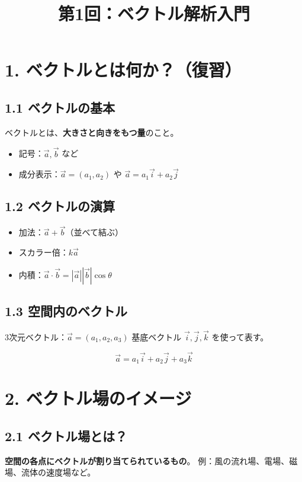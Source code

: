 \documentclass[a4j,11pt]{jsarticle}
\title{第1回：ベクトル解析入門}
\author{}
\date{}
\begin{document}
\maketitle

\section*{1. ベクトルとは何か？（復習）}

\subsection*{1.1 ベクトルの基本}
ベクトルとは、\textbf{大きさと向きをもつ量}のこと。

\begin{itemize}
  \item 記号：$\vec{a}, \vec{b}$ など
  \item 成分表示：$\vec{a} = (a_1, a_2)$ や $\vec{a} = a_1\vec{i} + a_2\vec{j}$
\end{itemize}

\subsection*{1.2 ベクトルの演算}
\begin{itemize}
  \item 加法：$\vec{a} + \vec{b}$（並べて結ぶ）
  \item スカラー倍：$k\vec{a}$
  \item 内積：$\vec{a} \cdot \vec{b} = |\vec{a}||\vec{b}|\cos\theta$
\end{itemize}

\subsection*{1.3 空間内のベクトル}
3次元ベクトル：$\vec{a} = (a_1, a_2, a_3)$  
基底ベクトル $\vec{i}, \vec{j}, \vec{k}$ を使って表す。

\[
\vec{a} = a_1\vec{i} + a_2\vec{j} + a_3\vec{k}
\]

\section*{2. ベクトル場のイメージ}

\subsection*{2.1 ベクトル場とは？}
\textbf{空間の各点にベクトルが割り当てられているもの}。  
例：風の流れ場、電場、磁場、流体の速度場など。
\end{document}
